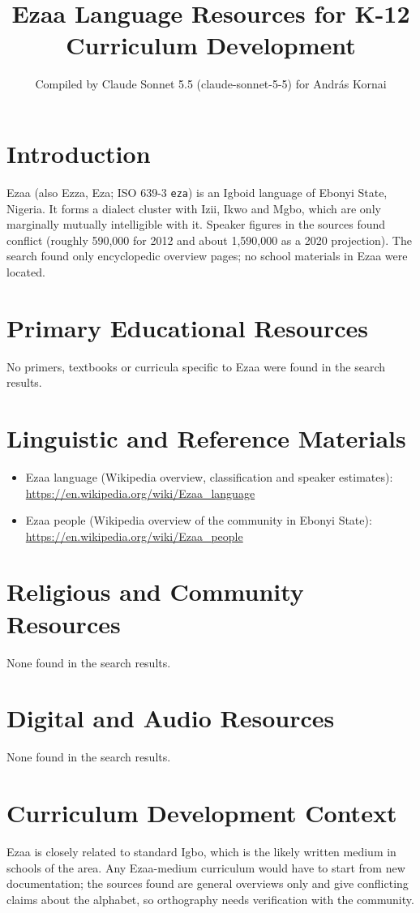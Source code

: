 \documentclass[12pt]{article}
\title{Ezaa Language Resources for K-12 Curriculum Development}
\author{Compiled by Claude Sonnet 5.5 (claude-sonnet-5-5) for Andr\'as Kornai}
\date{}
\begin{document}
\maketitle

\section{Introduction}
Ezaa (also Ezza, Eza; ISO 639-3 \texttt{eza}) is an Igboid language of Ebonyi State, Nigeria. It forms a dialect cluster with Izii, Ikwo and Mgbo, which are only marginally mutually intelligible with it. Speaker figures in the sources found conflict (roughly 590,000 for 2012 and about 1,590,000 as a 2020 projection). The search found only encyclopedic overview pages; no school materials in Ezaa were located.

\section{Primary Educational Resources}
No primers, textbooks or curricula specific to Ezaa were found in the search results.

\section{Linguistic and Reference Materials}
\begin{itemize}
\item Ezaa language (Wikipedia overview, classification and speaker estimates): \url{https://en.wikipedia.org/wiki/Ezaa_language}
\item Ezaa people (Wikipedia overview of the community in Ebonyi State): \url{https://en.wikipedia.org/wiki/Ezaa_people}
\end{itemize}

\section{Religious and Community Resources}
None found in the search results.

\section{Digital and Audio Resources}
None found in the search results.

\section{Curriculum Development Context}
Ezaa is closely related to standard Igbo, which is the likely written medium in schools of the area. Any Ezaa-medium curriculum would have to start from new documentation; the sources found are general overviews only and give conflicting claims about the alphabet, so orthography needs verification with the community.
\end{document}
